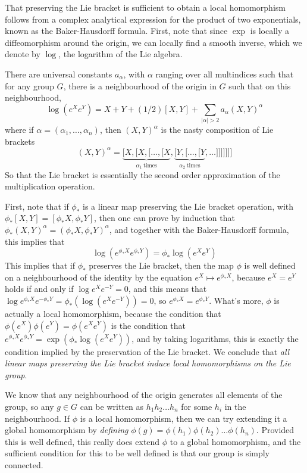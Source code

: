 That preserving the Lie bracket is sufficient to obtain a local homomorphism follows from a complex analytical expression for the product of two exponentials, known as the Baker-Hausdorff formula. First, note that since $\exp$ is locally a diffeomorphism around the origin, we can locally find a smooth inverse, which we denote by $\log$, the logarithm of the Lie algebra.

\begin{fact}
    There are universal constants $a_\alpha$, with $\alpha$ ranging over all multindices such that for any group $G$, there is a neighbourhood of the origin in $G$ such that on this neighbourhood,
    \[ \log(e^X e^Y) = X + Y + (1/2) [X,Y] + \sum_{|\alpha| > 2} a_\alpha (X,Y)^\alpha \]
    where if $\alpha = (\alpha_1, \dots, \alpha_n)$, then $(X,Y)^\alpha$ is the nasty composition of Lie brackets
    \[ (X,Y)^\alpha = \underbrace{[X, [X, [\dots, [X}_{\alpha_1\ \text{times}}, \underbrace{[Y, [\dots, [Y}_{\alpha_2\ \text{times}}, \dots]]]]]]] \]
    So that the Lie bracket is essentially the second order approximation of the multiplication operation.
\end{fact}

First, note that if $\phi_*$ is a linear map preserving the Lie bracket operation, with $\phi_*[X,Y] = [\phi_*X, \phi_*Y]$, then one can prove by induction that $\phi_* (X,Y)^\alpha = (\phi_* X, \phi_* Y)^\alpha$, and together with the Baker-Hausdorff formula, this implies that
%
\[ \log(e^{\phi_* X} e^{\phi_* Y}) = \phi_* \log(e^X e^Y) \]
%
This implies that if $\phi_*$ preserves the Lie bracket, then the map $\phi$ is well defined on a neighbourhood of the identity by the equation $e^X \mapsto e^{\phi_* X}$, because $e^X = e^Y$ holds if and only if $\log e^X e^{-Y} = 0$, and this means that $\log e^{\phi_* X} e^{- \phi_* Y} = \phi_* ( \log(e^X e^{-Y})) = 0$, so $e^{\phi_* X} = e^{\phi_* Y}$. What's more, $\phi$ is actually a local homomorphism, because the condition that $\phi(e^X) \phi(e^Y) = \phi(e^X e^Y)$ is the condition that $e^{\phi_* X} e^{\phi_* Y} = \exp(\phi_* \log(e^X e^Y))$, and by taking logarithms, this is exactly the condition implied by the preservation of the Lie bracket. We conclude that {\it all linear maps preserving the Lie bracket induce local homomorphisms on the Lie group}.

We know that any neighbourhood of the origin generates all elements of the group, so any $g \in G$ can be written as $h_1 h_2 \dots h_n$ for some $h_i$ in the neighbourhood. If $\phi$ is a local homomorphism, then we can try extending it a global homomorphism by {\it defining} $\phi(g) = \phi(h_1) \phi(h_2) \dots \phi(h_n)$. Provided this is well defined, this really does extend $\phi$ to a global homomorphism, and the sufficient condition for this to be well defined is that our group is simply connected.

